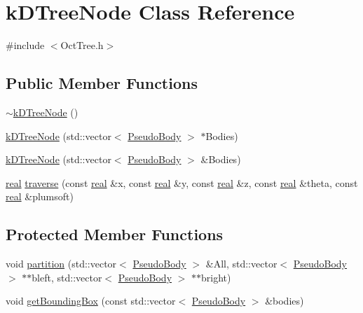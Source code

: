 \section{kDTreeNode Class Reference}
\label{classkDTreeNode}


{\ttfamily \#include $<$OctTree.h$>$}

\subsection*{Public Member Functions}
\begin{DoxyCompactItemize}
\item 
\hyperlink{classkDTreeNode_a706c34017d693b46a0c6d453ddd5fc81}{$\sim$kDTreeNode} ()
\item 
\hyperlink{classkDTreeNode_a9e4e0d3ada0dd2672cfc4fda7dae104f}{kDTreeNode} (std::vector$<$ \hyperlink{classPseudoBody}{PseudoBody} $>$ $\ast$Bodies)
\item 
\hyperlink{classkDTreeNode_a6a6c9d567a3f17d080b6ba020ca4eb57}{kDTreeNode} (std::vector$<$ \hyperlink{classPseudoBody}{PseudoBody} $>$ \&Bodies)
\item 
\hyperlink{Global_8h_a031f8951175b43076c2084a6c2173410}{real} \hyperlink{classkDTreeNode_aac65d3b4c401b238b2c4dd9947264ccf}{traverse} (const \hyperlink{Global_8h_a031f8951175b43076c2084a6c2173410}{real} \&x, const \hyperlink{Global_8h_a031f8951175b43076c2084a6c2173410}{real} \&y, const \hyperlink{Global_8h_a031f8951175b43076c2084a6c2173410}{real} \&z, const \hyperlink{Global_8h_a031f8951175b43076c2084a6c2173410}{real} \&theta, const \hyperlink{Global_8h_a031f8951175b43076c2084a6c2173410}{real} \&plumsoft)
\end{DoxyCompactItemize}
\subsection*{Protected Member Functions}
\begin{DoxyCompactItemize}
\item 
void \hyperlink{classkDTreeNode_a1080dd5e0ea2ec9adb350c42d1866105}{partition} (std::vector$<$ \hyperlink{classPseudoBody}{PseudoBody} $>$ \&All, std::vector$<$ \hyperlink{classPseudoBody}{PseudoBody} $>$ $\ast$$\ast$bleft, std::vector$<$ \hyperlink{classPseudoBody}{PseudoBody} $>$ $\ast$$\ast$bright)
\item 
void \hyperlink{classkDTreeNode_ae7a307cd022026795d9a0b1edd0aeeaf}{getBoundingBox} (const std::vector$<$ \hyperlink{classPseudoBody}{PseudoBody} $>$ \&bodies)
\end{DoxyCompactItemize}
